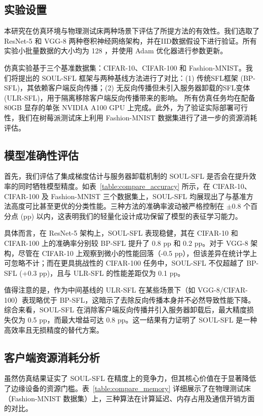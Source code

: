 \subsection{实验设置}
本研究在仿真环境与物理测试床两种场景下评估了所提方法的有效性。我们选取了 ResNet-5 和 VGG-8 两种卷积神经网络架构，并在IID数据假设下进行验证。所有实验小批量数据的大小均为 128 ，并使用 Adam 优化器进行参数更新。

仿真实验基于三个基准数据集：CIFAR-10、CIFAR-100 和 Fashion-MNIST。我们将提出的 SOUL-SFL 框架与两种基线方法进行了对比：(1) 传统SFL框架 (BP-SFL)，其依赖客户端反向传播；(2) 无反向传播但未引入服务器卸载的SFL变体 (ULR-SFL)，用于隔离移除客户端反向传播带来的影响。
所有仿真任务均在配备 80GB 显存的单张 NVIDIA A100 GPU 上完成。此外，为了验证实际部署可行性，我们在树莓派测试床上利用 Fashion-MNIST 数据集进行了进一步的资源消耗评估。

\subsection{模型准确性评估}
首先，我们评估了集成梯度估计与服务器卸载机制的 SOUL-SFL 是否会在提升效率的同时牺牲模型精度。如表~\ref{table:compare_accuracy} 所示，在 CIFAR-10、CIFAR-100 及 Fashion-MNIST 三个数据集上，SOUL-SFL 均展现出了与基准方法高度可比甚至更优的分类性能。三种方法的准确率波动被严格控制在 $\pm 0.8$ 个百分点 (pp) 以内，这表明我们的轻量化设计成功保留了模型的表征学习能力。

具体而言，在 ResNet-5 架构上，SOUL-SFL 表现稳健，其在 CIFAR-10 和 CIFAR-100 上的准确率分别较 BP-SFL 提升了 0.8 pp 和 0.2 pp。对于 VGG-8 架构，尽管在 CIFAR-10 上观察到微小的性能回落（-0.5 pp），但该差异在统计学上可忽略不计；而在更具挑战性的 CIFAR-100 任务中，SOUL-SFL 不仅超越了 BP-SFL (+0.3 pp)，且与 ULR-SFL 的性能差距仅为 0.1 pp。

值得注意的是，作为中间基线的 ULR-SFL 在某些场景下（如 VGG-8/CIFAR-100）表现略优于 BP-SFL，这暗示了去除反向传播本身并不必然导致性能下降。综合来看，SOUL-SFL 在消除客户端反向传播并引入服务器卸载后，最大精度损失仅为 0.5 pp，而最大增益可达 0.8 pp。这一结果有力证明了 SOUL-SFL 是一种高效率且无损精度的替代方案。

\subsection{客户端资源消耗分析}
虽然仿真结果证实了 SOUL-SFL 在精度上的竞争力，但其核心价值在于显著降低了边缘设备的资源门槛。表~\ref{table:compare_memory} 详细展示了在物理测试床（Fashion-MNIST 数据集）上，三种算法在计算延迟、内存占用及通信开销方面的对比。

